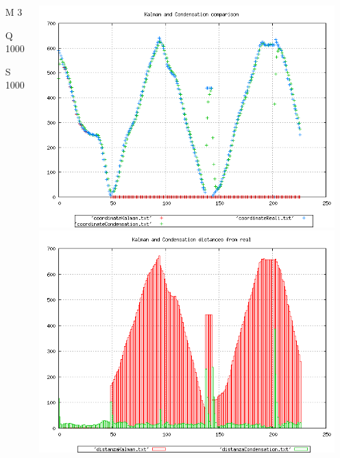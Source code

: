 \documentclass{beamer}
\begin{document}
{\begin{columns}
\begin{scriptsize}
\begin{itemize}
\item [M]3
\item [Q]1000
\item [S]1000
\end{itemize}
\end{scriptsize}
\includegraphics[scale=0.1]{../esperimenti/single_car/mod_3-Q_1000-S_1000/plot.png}\\
\includegraphics[scale=0.1]{../esperimenti/single_car/mod_3-Q_1000-S_1000/plot-distances.png}


\end{columns}}
\end{document}
